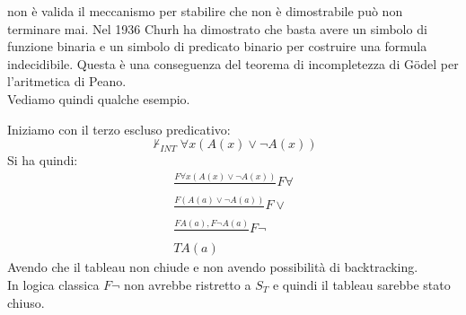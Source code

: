 \documentclass[a4paper,12pt, oneside]{book}
\begin{document}
non è valida il meccanismo per stabilire che non è dimostrabile può non
terminare mai. Nel 1936 Churh ha dimostrato che basta avere un simbolo di
funzione binaria e un simbolo di predicato binario per costruire una formula
indecidibile. Questa è una conseguenza del teorema di incompletezza di
G\"{o}del per l'aritmetica di Peano.\\
Vediamo quindi qualche esempio.
\begin{esempio}
  Iniziamo con il terzo escluso predicativo:
  \[\nvdash_{INT}\forall x(A(x)\lor \neg A(x))\]
  Si ha quindi:
  \begin{gather*}
    \frac{F\forall x(A(x)\lor \neg A(x))}{}F\forall\\
    \frac{F (A(a)\lor \neg A(a))}{}F\lor\\
    \frac{FA(a),F\neg A(a)}{}F\neg\\
    TA(a)
  \end{gather*}
  Avendo che il tableau non chiude e non avendo possibilità di backtracking.\\
  In logica classica $F\neg$ non avrebbe ristretto a $S_T$ e quindi il tableau
  sarebbe stato chiuso.
\end{esempio}
\end{document}
